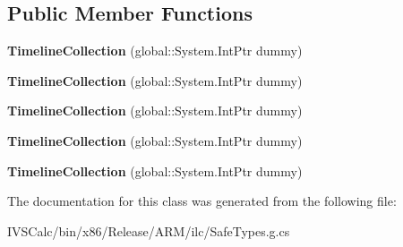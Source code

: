\subsection*{Public Member Functions}
\begin{DoxyCompactItemize}
\item 
\mbox{\label{class_windows_1_1_u_i_1_1_xaml_1_1_media_1_1_animation_1_1_timeline_collection_a14d872844c5de1e4ed756b5dc679fa6a}} 
{\bfseries Timeline\+Collection} (global\+::\+System.\+Int\+Ptr dummy)
\item 
\mbox{\label{class_windows_1_1_u_i_1_1_xaml_1_1_media_1_1_animation_1_1_timeline_collection_a14d872844c5de1e4ed756b5dc679fa6a}} 
{\bfseries Timeline\+Collection} (global\+::\+System.\+Int\+Ptr dummy)
\item 
\mbox{\label{class_windows_1_1_u_i_1_1_xaml_1_1_media_1_1_animation_1_1_timeline_collection_a14d872844c5de1e4ed756b5dc679fa6a}} 
{\bfseries Timeline\+Collection} (global\+::\+System.\+Int\+Ptr dummy)
\item 
\mbox{\label{class_windows_1_1_u_i_1_1_xaml_1_1_media_1_1_animation_1_1_timeline_collection_a14d872844c5de1e4ed756b5dc679fa6a}} 
{\bfseries Timeline\+Collection} (global\+::\+System.\+Int\+Ptr dummy)
\item 
\mbox{\label{class_windows_1_1_u_i_1_1_xaml_1_1_media_1_1_animation_1_1_timeline_collection_a14d872844c5de1e4ed756b5dc679fa6a}} 
{\bfseries Timeline\+Collection} (global\+::\+System.\+Int\+Ptr dummy)
\end{DoxyCompactItemize}


The documentation for this class was generated from the following file\+:\begin{DoxyCompactItemize}
\item 
I\+V\+S\+Calc/bin/x86/\+Release/\+A\+R\+M/ilc/Safe\+Types.\+g.\+cs\end{DoxyCompactItemize}
